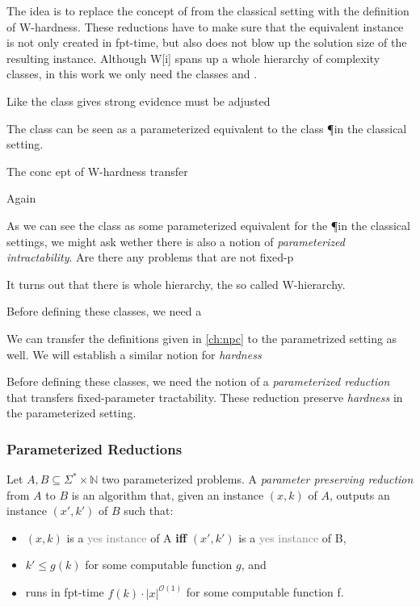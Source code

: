 The idea is to replace the concept of \NPh from the classical setting with the definition of  W-hardness.
These reductions have to make sure that the equivalent instance is not only created in fpt-time, but also does not blow up the solution size of the resulting instance.
Although W[i] spans up a whole hierarchy of complexity classes, in this work we only need the classes \WONE and \WTWO.

Like the class \NP gives strong evidence
must be adjusted

The class \FPT can be seen as a parameterized equivalent to the class \P in the classical setting. 

The conc ept of W-hardness transfer

Again 

As we can see the class \FPT as some parameterized equivalent for the \P in the classical settings, we might ask wether there is also a notion of \textit{parameterized intractability}.
Are there any problems that are not fixed-p

It turns out that there is whole hierarchy, the so called W-hierarchy.

Before defining these classes, we need a 

We can transfer the definitions given in \cref{ch:npc} to the parametrized setting as well. 
We will establish a similar notion for \textit{hardness}

Before defining these classes, we need the notion of a \textit{parameterized reduction} that transfers fixed-parameter tractability.
These reduction preserve \textit{hardness} in the parameterized setting.

\subsubsection{Parameterized Reductions}

\begin{definition} Let $A,B\subseteq \Sigma^*\times\mathbb{N}$ two parameterized problems. A \textit{parameter preserving reduction} from $A$ to $B$ is an algorithm that, given an instance $(x,k)$ of $A$, outputs an instance $(x', k')$ of $B$ such that:
    \begin{itemize}
        \item $(x,k)$ is a \textcolor{gray}{yes instance} of A \textbf{iff} $(x',k')$ is a \textcolor{gray}{yes instance} of B,
        \item $k' \leq g(k)$ for some computable function $g$, and
        \item runs in fpt-time $f(k)\cdot |x|^{\mathcal{O}(1)}$ for some computable function f.
    \end{itemize}
\end{definition}


